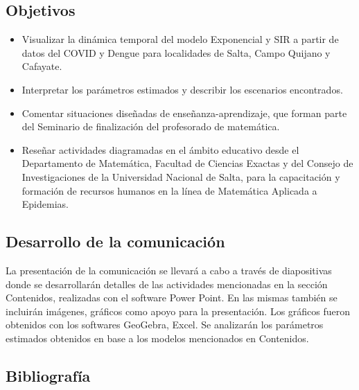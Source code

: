\subsection{Objetivos}

\begin{itemize}
	\item Visualizar la dinámica temporal del modelo Exponencial y SIR a partir de datos del COVID y Dengue para localidades de Salta, Campo Quijano y Cafayate.
	\item Interpretar los parámetros estimados y describir los escenarios encontrados.
	\item Comentar situaciones diseñadas de enseñanza-aprendizaje, que forman parte del Seminario de finalización del profesorado de matemática.
	\item Reseñar actividades diagramadas en el ámbito educativo desde el Departamento de Matemática, Facultad de Ciencias Exactas y del Consejo de Investigaciones de la Universidad Nacional de Salta, para la capacitación y formación de recursos humanos en la línea de Matemática Aplicada a Epidemias.
\end{itemize}

\subsection{Desarrollo de la comunicación}

La presentación de la comunicación se llevará a cabo a través de diapositivas donde se desarrollarán detalles de las actividades mencionadas en la sección Contenidos, realizadas con el software Power Point. En las mismas también se incluirán imágenes, gráficos como apoyo para la presentación. Los gráficos fueron obtenidos con los softwares GeoGebra, Excel. Se analizarán los parámetros estimados obtenidos en base a los modelos mencionados en Contenidos.

\subsection{Bibliografía}

\nocite{*}
\printbibliography[keyword={16}]